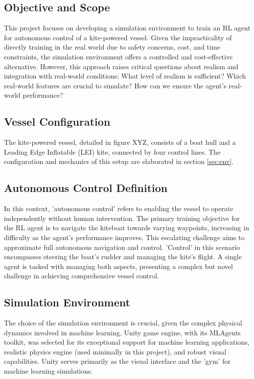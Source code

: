 \subsection{Objective and Scope}
This project focuses on developing a simulation environment to train an RL agent for autonomous control of a kite-powered vessel. Given the impracticality of directly training in the real world due to safety concerns, cost, and time constraints, the simulation environment offers a controlled and cost-effective alternative. However, this approach raises critical questions about realism and integration with real-world conditions: What level of realism is sufficient? Which real-world features are crucial to simulate? How can we ensure the agent's real-world performance?

\subsection{Vessel Configuration}
The kite-powered vessel, detailed in figure XYZ, consists of a boat hull and a Leading Edge Inflatable (LEI) kite, connected by four control lines. The configuration and mechanics of this setup are elaborated in section \ref{sec:env}.

\subsection{Autonomous Control Definition}
In this context, 'autonomous control' refers to enabling the vessel to operate independently without human intervention. The primary training objective for the RL agent is to navigate the kiteboat towards varying waypoints, increasing in difficulty as the agent's performance improves. This escalating challenge aims to approximate full autonomous navigation and control. 'Control' in this scenario encompasses steering the boat's rudder and managing the kite's flight. A single agent is tasked with managing both aspects, presenting a complex but novel challenge in achieving comprehensive vessel control.

\subsection{Simulation Environment}
The choice of the simulation environment is crucial, given the complex physical dynamics involved in machine learning. Unity game engine, with its MLAgents toolkit, was selected for its exceptional support for machine learning applications, realistic physics engine (used minimally in this project), and robust visual capabilities. Unity serves primarily as the visual interface and the 'gym' for machine learning simulations.

